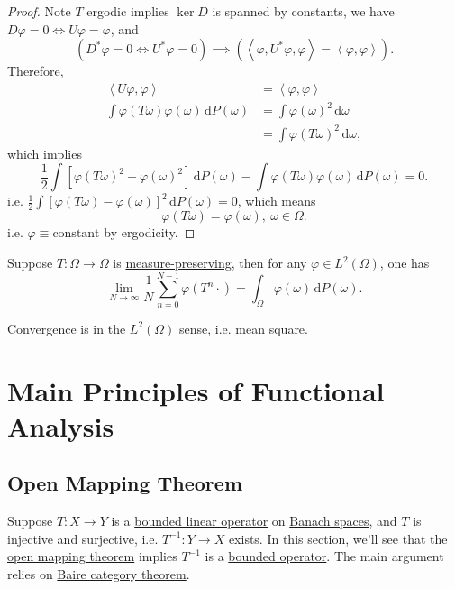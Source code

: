 \begin{proof}
	Note \(T\) ergodic implies \(\ker{D}\) is spanned by constants, we have \(D \varphi = 0 \Leftrightarrow U\varphi = \varphi\), and
	\[
		(D^{\ast} \varphi = 0 \Leftrightarrow U^{\ast} \varphi = 0) \implies (\left\langle \varphi, U^{\ast} \varphi, \varphi \right\rangle  = \left\langle \varphi, \varphi \right\rangle ).
	\]
	Therefore,
	\begin{align*}
		\left\langle U \varphi, \varphi \right\rangle                 & = \left\langle \varphi, \varphi \right\rangle   \\
		\int \varphi(T \omega) \varphi(\omega) \,\mathrm{d} P(\omega) & =\int \varphi(\omega)^2 \,\mathrm{d} \omega     \\
		                                                              & = \int \varphi(T \omega)^2 \,\mathrm{d} \omega,
	\end{align*}
	which implies
	\[
		\frac{1}{2} \int [\varphi(T \omega)^2 + \varphi(\omega)^2] \,\mathrm{d} P(\omega) - \int \varphi(T \omega) \varphi(\omega) \,\mathrm{d} P(\omega) = 0.
	\]
	i.e. \(\frac{1}{2} \int[\varphi(T \omega) - \varphi(\omega)]^2 \,\mathrm{d} P(\omega) = 0\), which means
	\[
		\varphi(T \omega) = \varphi(\omega),\ \omega \in \Omega.
	\]
	i.e. \(\varphi \equiv \text{constant}\) by ergodicity.
\end{proof}

\begin{theorem}\label{von-Newmann-ergodic}
	Suppose \(T\colon \Omega \to \Omega\) is \hyperref[def:measure-preserving]{measure-preserving}, then for any \(\varphi \in L^2(\Omega)\), one has
	\[
		\lim_{N \to \infty} \frac{1}{N} \sum_{n=0}^{N-1} \varphi(T^n \cdot) = \int_\Omega \varphi(\omega) \,\mathrm{d} P(\omega).
	\]
\end{theorem}
\begin{remark}
	Convergence is in the \(L^2(\Omega)\) sense, i.e. mean square.
\end{remark}

\chapter{Main Principles of Functional Analysis}

\section{Open Mapping Theorem}

Suppose \(T\colon X \to Y\) is a \hyperref[def:bounded-linear-op]{bounded linear operator} on \hyperref[def:Banach-space]{Banach spaces}, and \(T\) is injective and surjective, i.e. \(T^{-1}\colon Y \to X\) exists. In this section, we'll see that the \hyperref[thm:open-mapping]{open mapping theorem} implies \(T^{-1}\) is a \hyperref[rmk:bounded-op]{bounded operator}. The main argument relies on \hyperref[prop:Baire-category]{Baire category theorem}.

